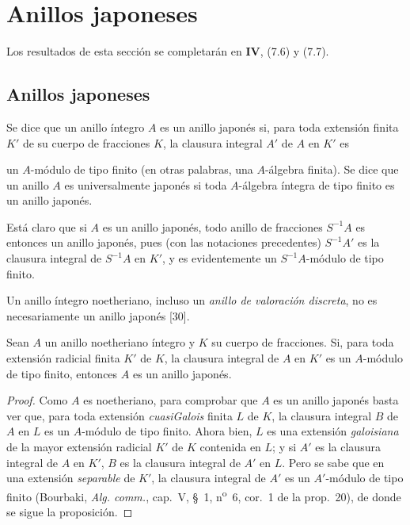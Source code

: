 \section{Anillos japoneses}
\label{section:0.23-fr}

Los resultados de esta sección se completarán en \textbf{IV}, (7.6) y (7.7).

\subsection{Anillos japoneses}
\label{subsection:0.23.1-fr}

\begin{definition}[23.1.1]
\label{0.23.1.1-fr}
Se dice que un anillo íntegro $A$ es un anillo japonés si, para toda
extensión finita $K'$ de su cuerpo de fracciones $K$, la clausura integral
$A'$ de $A$ en $K'$ es


un $A$-módulo de tipo finito \textup{(en otras palabras, una $A$-álgebra} finita\textup{)}. Se dice
que un anillo $A$ es universalmente japonés si toda $A$-álgebra íntegra de
tipo finito es un anillo japonés.
\end{definition}

Está claro que si $A$ es un anillo japonés, todo anillo de fracciones
$S^{-1}A$ es entonces un anillo japonés, pues (con las notaciones precedentes)
$S^{-1}A'$ es la clausura integral de $S^{-1}A$ en $K'$, y es
evidentemente un $S^{-1}A$-módulo de tipo finito.

Un anillo íntegro noetheriano, incluso un \emph{anillo de valoración discreta},
no es necesariamente un anillo japonés [30].

\begin{proposition}[23.1.2]
\label{0.23.1.2-fr}
Sean $A$ un anillo noetheriano íntegro y $K$ su cuerpo de fracciones. Si, para
toda extensión \textup{radicial} finita $K'$ de $K$, la clausura integral de $A$
en $K'$ es un $A$-módulo de tipo finito, entonces $A$ es un anillo japonés.
\end{proposition}

\begin{proof}
Como $A$ es noetheriano, para comprobar que $A$ es un anillo japonés basta
ver que, para toda extensión \emph{cuasiGalois} finita $L$ de $K$, la clausura
integral $B$ de $A$ en $L$ es un $A$-módulo de tipo
finito. Ahora bien, $L$ es
una extensión \emph{galoisiana} de la mayor extensión radicial $K'$ de $K$ contenida
en $L$; y si $A'$ es la clausura integral de $A$ en $K'$, $B$ es la clausura
integral de $A'$ en $L$. Pero se sabe que en una extensión \emph{separable} de $K'$,
la clausura integral de $A'$ es un $A'$-módulo de tipo finito (Bourbaki,
\emph{Alg. comm.}, cap.~V, §~1, n\textsuperscript{o}~6, cor.~1 de la
prop.~20), de donde se sigue la proposición.
\end{proof}

